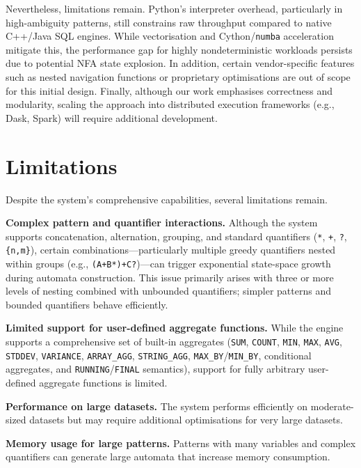 Nevertheless, limitations remain.  Python's interpreter overhead,
particularly in high-ambiguity patterns, still constrains raw
throughput compared to native C++/Java SQL engines.  While
vectorisation and Cython/\texttt{numba} acceleration mitigate this,
the performance gap for highly nondeterministic workloads persists due
to potential NFA state explosion.  In addition, certain vendor-specific
features such as nested navigation functions or proprietary
optimisations are out of scope for this initial design.
Finally, although our work emphasises correctness and modularity,
scaling the approach into distributed execution frameworks
(e.g., Dask, Spark) will require additional development.

\section{Limitations}
\label{sec:conc-limitations}

Despite the system's comprehensive capabilities, several limitations
remain.

\textbf{Complex pattern and quantifier interactions.}
Although the system supports concatenation, alternation, grouping, and
standard quantifiers (\texttt{*}, \texttt{+}, \texttt{?},
\texttt{\{n,m\}}), certain combinations---particularly multiple greedy
quantifiers nested within groups (e.g., \texttt{(A+B*)+C?})---can
trigger exponential state-space growth during automata construction.
This issue primarily arises with three or more levels of nesting
combined with unbounded quantifiers; simpler patterns and bounded
quantifiers behave efficiently.

\textbf{Limited support for user-defined aggregate functions.}
While the engine supports a comprehensive set of built-in aggregates
(\texttt{SUM}, \texttt{COUNT}, \texttt{MIN}, \texttt{MAX},
\texttt{AVG}, \texttt{STDDEV}, \texttt{VARIANCE}, \texttt{ARRAY\_AGG},
\texttt{STRING\_AGG}, \texttt{MAX\_BY}/\texttt{MIN\_BY}, conditional
aggregates, and \texttt{RUNNING}/\texttt{FINAL} semantics), support
for fully arbitrary user-defined aggregate functions is limited.

\textbf{Performance on large datasets.}
The system performs efficiently on moderate-sized datasets but may
require additional optimisations for very large datasets.

\textbf{Memory usage for large patterns.}
Patterns with many variables and complex quantifiers can generate
large automata that increase memory consumption.


